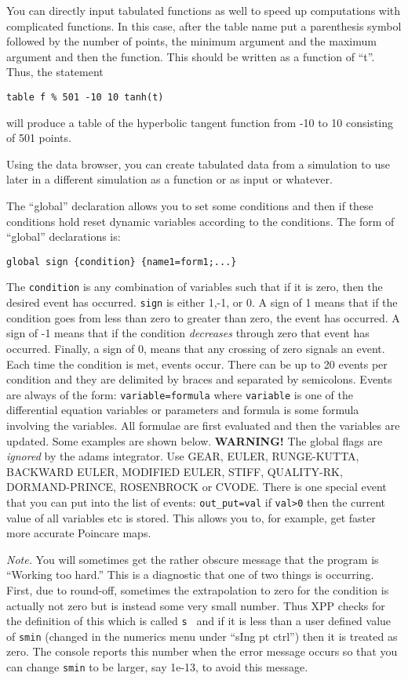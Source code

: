 \documentclass{article}
\newcommand{\bvb}{\begin{verbatim}}
\newcommand{\TCC}[1]{\medskip

\addcontentsline{toc}{subsubsection}{#1}
\noindent{\bf {#1}.}}
\begin{document}
You can directly
input tabulated functions as well to speed up computations with
complicated functions.  In this case, after the table name put a
parenthesis symbol followed by the number of points, the minimum
argument and the maximum argument and then the function.  This should
be written as a function of ``t''.  Thus, the statement
\begin{verbatim}
table f % 501 -10 10 tanh(t)
\end{verbatim}
will produce a table of the hyperbolic tangent function from -10 to 10
consisting of 501 points.

Using the data browser, you can create tabulated data from a
simulation to use later in a different simulation as a function or as
input or whatever.

\TCC{Global Flags}
The ``global'' declaration allows you to set some conditions and then
if these conditions hold reset dynamic variables according to the
conditions.  The form of ``global'' declarations is:
\bvb
global sign {condition} {name1=form1;...}
\end{verbatim}
The {\tt condition} is any combination of variables such
that if it is zero, then the desired event has occurred.
{\tt sign} is either 1,-1, or 0.  A sign of 1 means that if the
condition goes from less than zero to greater than zero, the event has
occurred. A sign of -1 means that if the condition {\em decreases}
through zero that event has occurred.  Finally, a sign of 0, means
that any crossing of zero signals an event.  Each time the condition
is met, events occur.  There can be up to 20 events per condition and
they are delimited by braces and separated by semicolons.  Events are
always of the form: {\tt variable=formula} where {\tt variable} is one
of the differential equation variables or parameters
and formula is some formula
involving the variables.  All formulae are first evaluated and then
the variables are updated.  Some examples are shown below.{\bf
WARNING!} The global flags are {\em ignored} by the adams
integrator.  Use GEAR, EULER, RUNGE-KUTTA, BACKWARD EULER, MODIFIED
EULER, STIFF, QUALITY-RK, DORMAND-PRINCE, ROSENBROCK or CVODE.
There is one special event that you can put into the list of
events: {\tt out\_put=val} if {\tt val>0} then the current value
of all variables etc is stored.  This allows you to, for example,
get faster more accurate Poincare maps.


{\em Note.} You will sometimes get the rather obscure message that the
program is ``Working too hard.''  This is a diagnostic that one of two
things is occurring.  First, due to round-off, sometimes the
extrapolation to zero for the condition is actually not zero but is
instead some very small number.  Thus XPP checks for the definition of
this which is called {\tt s } and if it is less than a user defined
value of {\tt smin} (changed in the numerics menu under ``sIng pt ctrl'')
then it is treated as zero.  The console reports this number when the
error message occurs so that you can change {\tt smin} to be larger,
say 1e-13, to avoid this message.
\end{document}
